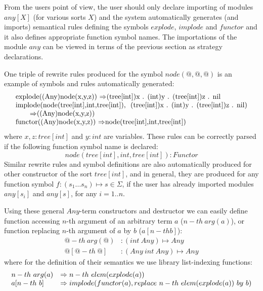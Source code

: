\documentclass{article}
\begin{document}
{From the users point of view, the user should 
only declare importing of modules $any[X]$ (for various sorts $X$) and
the system automatically generates (and imports) semantical rules
defining the symbols $explode$, $implode$ and $functor$ and
it also defines appropriate function symbol names. 
The importations of the module $any$ can be viewed in terms of the
previous section as strategy declarations.

One triple of rewrite rules produced for the symbol $node(@,@,@)$ is
an example of symbols and rules automatically generated:
%
\[\begin{tabular}{l}
  explode((Any)node(x,y,z)) \rewrite 
        (tree[int])x  .  (int)y  .  (tree[int])z  .  nil \\
  implode(node(tree[int],int,tree[int]),~
        (tree[int])x  .  (int)y  .  (tree[int])z  .  nil) \\
        \qquad \rewrite
        ((Any)node(x,y,z)) \\
  functor((Any)node(x,y,z)) \rewrite 
        node(tree[int],int,tree[int])
\end{tabular}\]
%
where $x, z : tree[int]$ and $y : int$ are variables. These rules
can be correctly parsed if the following function symbol name is declared:
\[
node(tree[int],int,tree[int]) : Functor
\]
Similar rewrite rules and symbol definitions are also automatically produced
for other constructor of the sort $tree[int]$, and in general, 
they are produced for any 
function symbol $f : (s_1 \ldots s_n) \mapsto s \in \Sigma$, 
if the user has already 
imported modules $any[s_i]$ and $any[s]$, for any $i=1..n$.

\bigskip

Using these general $Any$-term constructors and destructor 
we can easily define
function accessing $n$-th argument of an arbitrary term $a$ ($n-th~arg(a)$),
or function replacing $n$-th argument of $a$ by $b$ ($a[n-th b]$):
\[\begin{array}{ll}
    @-th~arg(@)      & : (int~Any) \mapsto Any   \\
    @[@-th~@]   & : (Any~int~Any) \mapsto Any
\end{array}\]
where for the definition of their semantics we use library list-indexing 
functions:
\[\begin{array}{ll}
    n-th~arg(a)      & \rewrite n-th~elem(explode(a)) \\
    a[n-th~b]        & \rewrite implode(functor(a),
                          replace~ n-th~elem(explode(a))~by~b)
\end{array}\]

}
\end{document}

